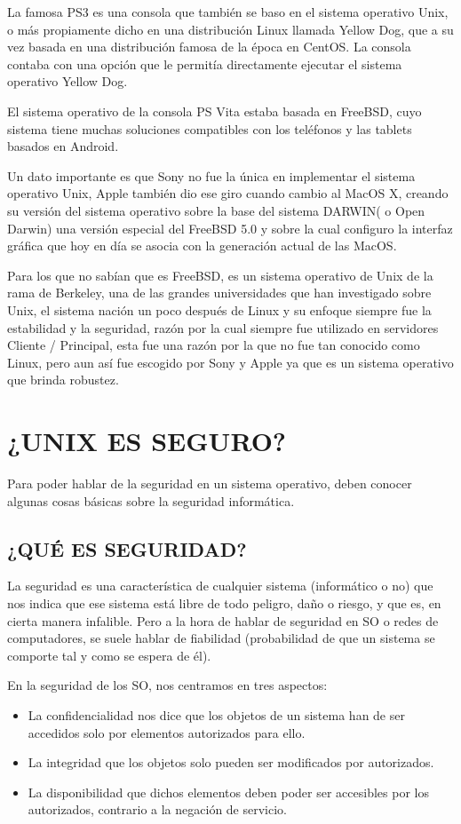 La  famosa  PS3  es  una  consola  que  también  se  baso en el sistema  operativo  Unix, o más propiamente dicho  en  una  distribución  Linux llamada  Yellow Dog, que  a su vez 
basada en una distribución famosa de la época en CentOS. La consola  contaba   con una  opción que le permitía directamente  ejecutar el sistema operativo Yellow  Dog.
 
El sistema  operativo de  la consola  PS Vita  estaba  basada  en  FreeBSD, cuyo sistema tiene muchas soluciones compatibles con los  teléfonos  y las  tablets basados en 
Android.
 
Un dato importante  es  que  Sony no  fue la única  en  implementar  el sistema  operativo  Unix, Apple  también dio ese giro cuando cambio al MacOS X, creando  su versión del 
sistema operativo sobre  la  base del sistema DARWIN( o Open Darwin) una versión especial  del FreeBSD 5.0  y sobre la cual  configuro  la  interfaz gráfica que hoy en día  se 
asocia  con la  generación actual de las MacOS.

Para  los que  no  sabían  que  es  FreeBSD, es  un sistema  operativo de  Unix de la  rama de Berkeley, una de las grandes  universidades que han investigado sobre Unix, el 
sistema nación  un poco  después de  Linux   y  su enfoque  siempre  fue la estabilidad  y la seguridad, razón por la cual siempre fue  utilizado en servidores  Cliente / 
Principal, esta fue  una  razón por la que  no fue  tan conocido como  Linux, pero  aun así  fue escogido  por  Sony  y Apple ya que  es  un sistema operativo que  brinda 
robustez.


\section*{¿UNIX ES  SEGURO?}
Para  poder  hablar  de  la seguridad  en un sistema operativo, deben conocer  algunas cosas básicas  sobre la seguridad informática.

\subsection*{¿QUÉ ES SEGURIDAD?}
La seguridad  es una característica  de cualquier sistema (informático o no) que nos indica que ese sistema está  libre de todo peligro, daño o riesgo, y que es, en cierta manera 
infalible. Pero a la hora de hablar de seguridad en SO o redes de computadores, se suele hablar de fiabilidad (probabilidad de que un sistema se comporte tal y como se espera de 
él).

En la seguridad  de  los  SO, nos centramos en tres aspectos:
\begin{itemize}
	\item La confidencialidad nos dice que los objetos de un sistema han  de ser accedidos solo por elementos autorizados para ello.
	\item La integridad que los objetos solo pueden ser modificados por autorizados. 
	\item La disponibilidad que dichos elementos deben poder ser accesibles por los autorizados, contrario a la negación de servicio.
\end{itemize}

